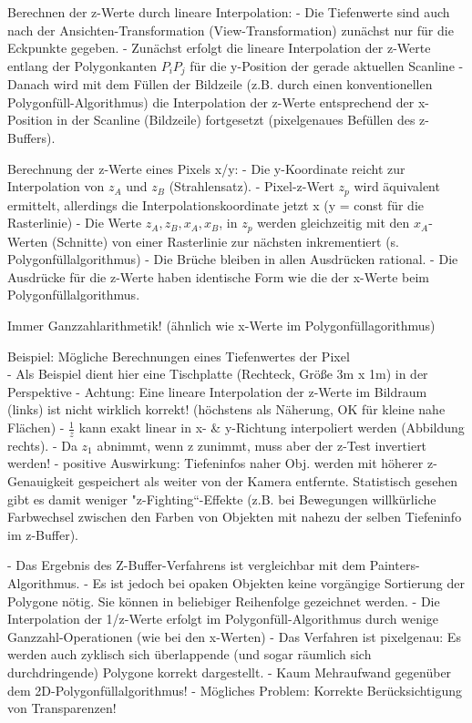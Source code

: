 \documentclass[10pt,landscape]{article}
\begin{document}
\begin{multicols}{3}
  Berechnen der z-Werte durch lineare Interpolation:
  - Die Tiefenwerte sind auch nach der Ansichten-Transformation (View-Transformation) zunächst nur für die Eckpunkte gegeben.
  - Zunächst erfolgt die lineare Interpolation der z-Werte entlang der Polygonkanten $P_i P_j$ für die y-Position der gerade aktuellen Scanline
  - Danach wird mit dem Füllen der Bildzeile (z.B. durch einen konventionellen Polygonfüll-Algorithmus) die Interpolation der z-Werte entsprechend der x-Position in der Scanline (Bildzeile) fortgesetzt (pixelgenaues Befüllen des z-Buffers).
  
  Berechnung der z-Werte eines Pixels x/y:
  - Die y-Koordinate reicht zur Interpolation von $z_A$ und $z_B$ (Strahlensatz).
  - Pixel-z-Wert $z_p$ wird äquivalent ermittelt, allerdings die Interpolationskoordinate jetzt x (y = const für die Rasterlinie)
  - Die Werte $z_A, z_B, x_A, x_B$, in $z_p$ werden gleichzeitig mit den $x_A$-Werten (Schnitte) von einer Rasterlinie zur nächsten inkrementiert (s. Polygonfüllalgorithmus)
  - Die Brüche bleiben in allen Ausdrücken rational. 
  - Die Ausdrücke für die z-Werte haben identische Form wie die der x-Werte beim Polygonfüllalgorithmus.
  
  Immer Ganzzahlarithmetik! (ähnlich wie x-Werte im Polygonfüllagorithmus)
  
  Beispiel: Mögliche Berechnungen eines Tiefenwertes der Pixel\\
  - Als Beispiel dient hier eine Tischplatte (Rechteck, Größe 3m x 1m) in der Perspektive 
  - Achtung: Eine lineare Interpolation der z-Werte im Bildraum (links) ist nicht wirklich korrekt! (höchstens als Näherung, OK für kleine nahe Flächen)
  - $\frac{1}{z}$ kann exakt linear in x- \& y-Richtung interpoliert werden (Abbildung rechts).
  - Da $z_1$ abnimmt, wenn z zunimmt, muss aber der z-Test invertiert werden!
  - positive Auswirkung: Tiefeninfos naher Obj. werden mit höherer z-Genauigkeit gespeichert als weiter von der Kamera entfernte. Statistisch gesehen gibt es damit weniger "z-Fighting“-Effekte (z.B. bei Bewegungen willkürliche Farbwechsel zwischen den Farben von Objekten mit nahezu der selben Tiefeninfo im z-Buffer).
  
  
  - Das Ergebnis des Z-Buffer-Verfahrens ist vergleichbar mit dem Painters-Algorithmus.
  - Es ist jedoch bei opaken Objekten keine vorgängige Sortierung der Polygone nötig. Sie können in beliebiger Reihenfolge gezeichnet werden.
  - Die Interpolation der 1/z-Werte erfolgt im Polygonfüll-Algorithmus durch wenige Ganzzahl-Operationen (wie bei den x-Werten)
  - Das Verfahren ist pixelgenau: Es werden auch zyklisch sich überlappende (und sogar räumlich sich durchdringende) Polygone korrekt dargestellt.
  - Kaum Mehraufwand gegenüber dem 2D-Polygonfüllalgorithmus!
  - Mögliches Problem: Korrekte Berücksichtigung von Transparenzen!
  

\end{multicols}
\end{document}
